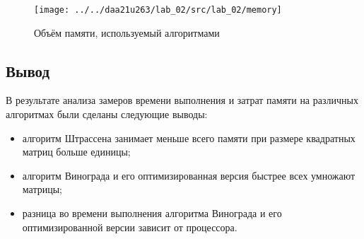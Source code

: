 \begin{figure}
	\centering
	\texttt{[image: ../../daa21u263/lab\_02/src/lab\_02/memory]}
	\caption{Объём памяти, используемый алгоритмами}
	\label{fig:memory}
\end{figure}


\subsection{Вывод}

В результате анализа замеров времени выполнения и затрат памяти на различных алгоритмах были сделаны следующие выводы:

\begin{itemize}
	\item алгоритм Штрассена занимает меньше всего памяти при размере квадратных матриц больше единицы;
	\item алгоритм Винограда и его оптимизированная версия быстрее всех умножают матрицы;
	\item разница во времени выполнения алгоритма Винограда и его оптимизированной версии зависит от процессора.
\end{itemize}